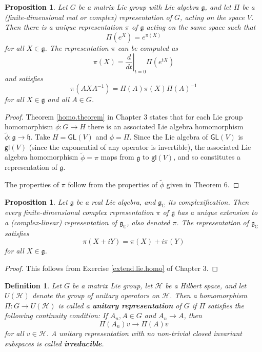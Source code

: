 \documentclass{amsbook}
\let \frak = \mathfrak
\theoremstyle{plain}
\newtheorem{definition}[theorem]{Definition}
\newtheorem{proposition}[theorem]{Proposition}
\numberwithin{equation}{chapter}
\numberwithin{theorem}{chapter}
\begin{document}
\begin{proposition}
\label{relating.rep}Let $G$ be a matrix Lie group with Lie algebra $\frak{g}$,
and let $\Pi$ be a (finite-dimensional real or complex) representation of $G$,
acting on the space $V$. Then there is a unique representation $\pi$ of
$\frak{g}$ acting on the same space such that
\[
\Pi(e^{X})=e^{\pi(X)}%
\]
for all $X\in\frak{g}$. The representation $\pi$ can be computed as
\[
\pi(X)=\left.  \frac{d}{dt}\right|  _{t=0}\Pi\left(  e^{tX}\right)
\]
and satisfies
\[
\pi\left(  AXA^{-1}\right)  =\Pi(A)\pi(X)\Pi(A)^{-1}%
\]
for all $X\in\frak{g}$ and all $A\in G$.
\end{proposition}

\begin{proof}
Theorem \ref{homo.theorem} in Chapter 3 states that for each Lie group
homomorphism $\phi:G\rightarrow H$ there is an associated Lie algebra
homomorphism $\widetilde{\phi}:\frak{g}\rightarrow\frak{h}$. Take
$H=\mathsf{GL}(V)$ and $\phi=\Pi$. Since the Lie algebra of $\mathsf{GL}(V)$
is $\mathsf{gl}(V)$ (since the exponential of any operator is invertible), the
associated Lie algebra homomorphism $\widetilde{\phi}=\pi$ maps from
$\frak{g}$ to $\mathsf{gl}(V)$, and so constitutes a representation of
$\frak{g}$.

The properties of $\pi$ follow from the properties of $\widetilde{\phi}$ given
in Theorem 6.
\end{proof}

\begin{proposition}
\label{rep.complex}Let $\frak{g}$ be a real Lie algebra, and $\frak{g}%
_{\mathbb{C}}$ its complexification. Then every finite-dimensional complex
representation $\pi$ of $\frak{g}$ has a unique extension to a
(complex-linear) representation of $\frak{g}_{\mathbb{C}}$, also denoted $\pi
$. The representation of $\frak{g}_{\mathbb{C}}$ satisfies
\[
\pi(X+iY)=\pi(X)+i\pi(Y)
\]
for all $X\in\frak{g}$.
\end{proposition}

\begin{proof}
This follows from Exercise \ref{extend.lie.homo} of Chapter 3.
\end{proof}

\begin{definition}
Let $G$ be a matrix Lie group, let $\mathcal{H}$ be a Hilbert space, and let
$U(\mathcal{H})$ denote the group of unitary operators on $\mathcal{H}$. Then
a homomorphism $\Pi:G\rightarrow U(\mathcal{H})$ is called a \textbf{unitary
representation} of $G$ if $\Pi$ satisfies the following continuity condition:
If $A_{n},A\in G$ and $A_{n}\rightarrow A$, then
\[
\Pi(A_{n})v\rightarrow\Pi(A)v
\]
for all $v\in\mathcal{H}$. A unitary representation with no non-trivial
\textit{closed} invariant subspaces is called \textbf{irreducible}.
\end{definition}
\end{document}
